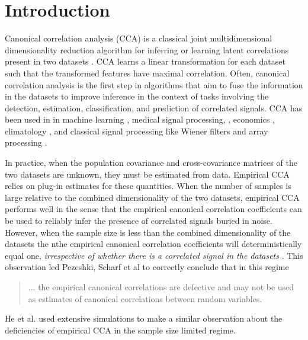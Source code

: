 \section{Introduction} Canonical correlation analysis (CCA) is a classical joint
multidimensional dimensionality reduction algorithm for inferring or learning latent
correlations present in two datasets \cite{hotelling1936relations}. CCA learns a linear
transformation for each dataset such that the transformed features have maximal
correlation. Often, canonical correlation analysis is the first step in algorithms that
aim to fuse the information in the datasets to improve inference in the context of tasks
involving the detection, estimation, classification, and prediction of correlated
signals. CCA has been used in in machine learning \cite{hardoon2004canonical,
  dhillon2011multi, zhai2015instance, hardoon2006correlation,chaudhuri2009multi}, medical
signal processing, \cite{ correa2010canonical,arbabshirani2010comparison,
  khalid2013improving, lin2013identifying, seoane2014canonical, zhang2013l1,
  nakanishi2014enhancing, spuler2014spatial, kuzilek2014comparison},
economics \cite{todros2012measure}, climatology \cite{wilks2014probabilistic,
  prera2014using, steward2014assimilating}, and classical signal processing like Wiener
filters \cite{scharf1998wiener} and array processing \cite{ge2009does}.

In practice, when the population covariance and cross-covariance matrices of the two
datasets are unknown, they must be estimated from data. Empirical CCA relies on plug-in
estimates for these quantities. When the number of samples is large relative to the
combined dimensionality of the two datasets, empirical CCA performs well in the sense that
the empirical canonical correlation coefficients can be used to reliably infer the
presence of correlated signals buried in noise. However, when the sample size is less than
the combined dimensionality of the datasets the nthe empirical canonical correlation
coefficients will deterministically equal one, \textit{irrespective of whether there is a
  correlated signal in the datasets} \cite{pezeshki2004empirical}. This observation
led Pezeshki, Scharf et al to correctly conclude that in this regime
\begin{quote}
    ... the empirical canonical correlations are defective and may not be used as  estimates of canonical correlations between random
    variables.
\end{quote}
He et al. \cite{ge2009does} used extensive simulations to make a similar observation about
the deficiencies of empirical CCA in the sample size limited regime.

